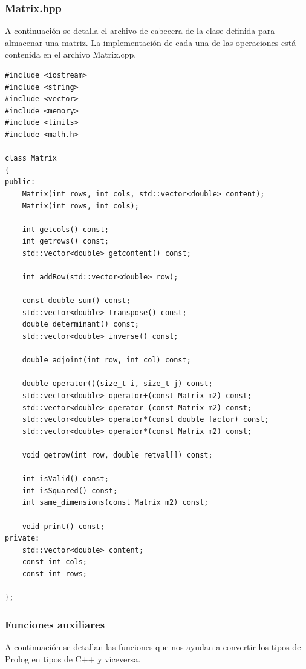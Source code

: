 \documentclass[a4paper,12pt]{article}
\begin{document}
\subsubsection{Matrix.hpp}
A continuación se detalla el archivo de cabecera de la clase definida para almacenar una matriz. La implementación de cada una de las operaciones está contenida en el archivo Matrix.cpp.

\begin{lstlisting}[style=C++]
#include <iostream>
#include <string>
#include <vector>
#include <memory>
#include <limits>
#include <math.h>

class Matrix
{
public:
    Matrix(int rows, int cols, std::vector<double> content);
    Matrix(int rows, int cols);
    
    int getcols() const;
    int getrows() const;
    std::vector<double> getcontent() const;
    
    int addRow(std::vector<double> row);
	
	const double sum() const;
	std::vector<double> transpose() const;
	double determinant() const;
	std::vector<double> inverse() const;

	double adjoint(int row, int col) const;

    double operator()(size_t i, size_t j) const;
    std::vector<double> operator+(const Matrix m2) const;
    std::vector<double> operator-(const Matrix m2) const;
    std::vector<double> operator*(const double factor) const;
    std::vector<double> operator*(const Matrix m2) const;

    void getrow(int row, double retval[]) const;
    
    int isValid() const;
	int isSquared() const;
	int same_dimensions(const Matrix m2) const;

	void print() const;
private:
    std::vector<double> content;
    const int cols;
    const int rows;
    
};
\end{lstlisting}

\subsubsection{Funciones auxiliares}
A continuación se detallan las funciones que nos ayudan a convertir los tipos de Prolog en tipos de C++ y viceversa.
\end{document}
